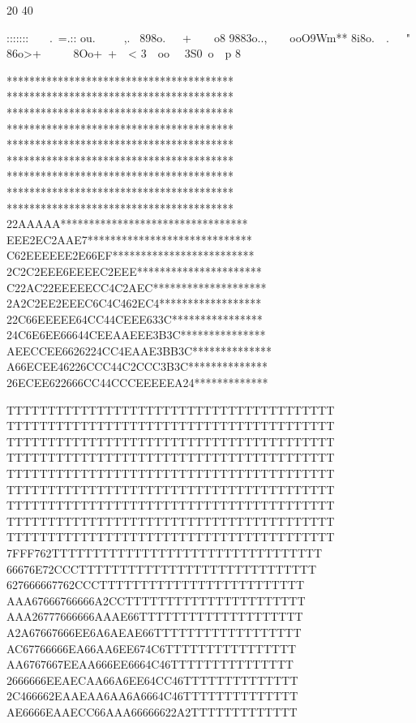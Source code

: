 20 40

                                        
                                        
                                        
                                        
                                        
                                        
                                        
                                        
                                        
:::::::                                 
~~~.~=.::%
ou.~~~~~,.~%
898o.~~~+~~~~o8%
9883o..,~~~~ooO9Wm**                    
8i8o.~~.~~~"%
86o>+~~~~~%
8Oo+~+~~<%
3~~oo~~%
3S0~o~~p%
8%

****************************************
****************************************
****************************************
****************************************
****************************************
****************************************
****************************************
****************************************
****************************************
22AAAAA*********************************
EEE2EC2AAE7*****************************
C62EEEEEE2E66EF*************************
2C2C2EEE6EEEEC2EEE**********************
C22AC22EEEEECC4C2AEC********************
2A2C2EE2EEEC6C4C462EC4******************
22C66EEEEE64CC44CEEE633C****************
24C6E6EE66644CEEAAEEE3B3C***************
AEECCEE6626224CC4EAAE3BB3C**************
A66ECEE46226CCC44C2CCC3B3C**************
26ECEE622666CC44CCCEEEEEA24*************

TTTTTTTTTTTTTTTTTTTTTTTTTTTTTTTTTTTTTTTT
TTTTTTTTTTTTTTTTTTTTTTTTTTTTTTTTTTTTTTTT
TTTTTTTTTTTTTTTTTTTTTTTTTTTTTTTTTTTTTTTT
TTTTTTTTTTTTTTTTTTTTTTTTTTTTTTTTTTTTTTTT
TTTTTTTTTTTTTTTTTTTTTTTTTTTTTTTTTTTTTTTT
TTTTTTTTTTTTTTTTTTTTTTTTTTTTTTTTTTTTTTTT
TTTTTTTTTTTTTTTTTTTTTTTTTTTTTTTTTTTTTTTT
TTTTTTTTTTTTTTTTTTTTTTTTTTTTTTTTTTTTTTTT
TTTTTTTTTTTTTTTTTTTTTTTTTTTTTTTTTTTTTTTT
7FFF762TTTTTTTTTTTTTTTTTTTTTTTTTTTTTTTTT
66676E72CCCTTTTTTTTTTTTTTTTTTTTTTTTTTTTT
627666667762CCCTTTTTTTTTTTTTTTTTTTTTTTTT
AAA67666766666A2CCTTTTTTTTTTTTTTTTTTTTTT
AAA26777666666AAAE66TTTTTTTTTTTTTTTTTTTT
A2A67667666EE6A6AEAE66TTTTTTTTTTTTTTTTTT
AC67766666EA66AA6EE674C6TTTTTTTTTTTTTTTT
AA6767667EEAA666EE6664C46TTTTTTTTTTTTTTT
2666666EEAECAA66A6EE64CC46TTTTTTTTTTTTTT
2C466662EAAEAA6AA6A6664C46TTTTTTTTTTTTTT
AE6666EAAECC66AAA66666622A2TTTTTTTTTTTTT

